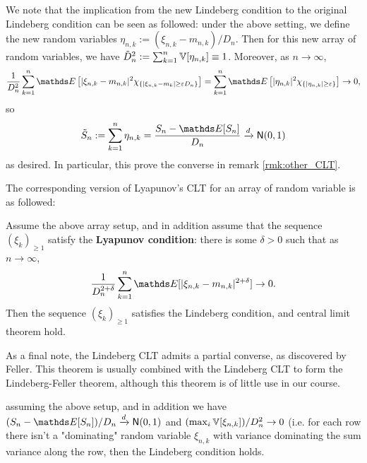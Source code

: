 \begin{unexaminable}
\begin{remark}
We note that the implication from the new Lindeberg condition to the original Lindeberg condition can be seen as followed: under the above setting, we define the new random variables $\eta_{n,k} := (\xi_{n,k} - m_{n,k})/D_n$. Then for this new array of random variables, we have $\tilde{D}_{n}^2 := \sum_{k=1}^n \mathbb{V}[\eta_{n,k}] \equiv 1$. Moreover, as $n\to\infty$,
\begin{equation}
    \frac{1}{D_n^2}\sum_{k=1}^n \E\sqbracket{|\xi_{n,k} - m_{n,k}|^2 \chi_{\set{|\xi_{n,k}-m_k|\ge \varepsilon D_n}}} = \sum_{k=1}^n \E\sqbracket{|\eta_{n,k}|^2 \chi_{\set{|\eta_{n,k}|\ge \varepsilon}}} \to 0,
\end{equation}
so
\begin{equation*}
    \tilde{S}_n := \sum_{k=1}^n \eta_{n,k} = \frac{S_n - \E[S_n]}{D_n} \xrightarrow{d} \mathsf{N}(0,1)
\end{equation*}
as desired. In particular, this prove the converse in remark \ref{rmk:other_CLT}.
\end{remark}

The corresponding version of Lyapunov's CLT for an array of random variable is as followed:
\begin{corollary}
Assume the above array setup, and in addition assume that the sequence $(\xi_k)_{\geq 1}$ satisfy the \textbf{Lyapunov condition}: there is some $\delta > 0$ such that as $n \to \infty$,
\begin{equation}
    \frac{1}{D_n^{2 +\delta}} \sum_{k=1}^n \E[|\xi_{n,k} - m_{n,k}|^{2+\delta}] \to 0.
\end{equation}
Then the sequence $(\xi_k)_{\geq 1}$ satisfies the Lindeberg condition, and central limit theorem hold.
\end{corollary}

As a final note, the Lindeberg CLT admits a partial converse, as discovered by Feller. This theorem is usually combined with the Lindeberg CLT to form the Lindeberg-Feller theorem, although this theorem is of little use in our course.
\begin{theorem}
assuming the above setup, and in addition we have $(S_n - \E[S_n])/D_n \xrightarrow{d} \mathsf{N}(0,1)$ and $(\max_i \mathbb{V}[\xi_{n,k}])/D_n^2 \to 0$ (i.e. for each row there isn't a "dominating" random variable $\xi_{n,k}$ with variance dominating the sum variance along the row, then the Lindeberg condition holds. 
\end{theorem}
\end{unexaminable}

